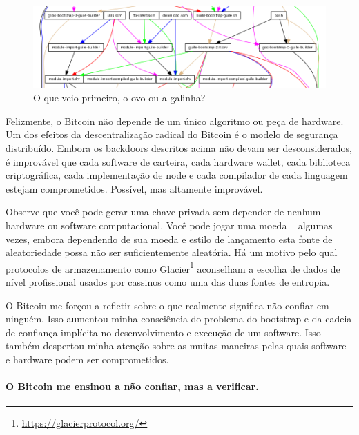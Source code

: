\begin{figure}
  \includegraphics{assets/images/guix-bootstrap-dependencies.png}
  \caption{O que veio primeiro, o ovo ou a galinha?}
  \label{fig:guix-bootstrap-dependencies}
\end{figure}

Felizmente, o Bitcoin não depende de um único algoritmo ou peça de hardware. Um dos efeitos da descentralização radical do Bitcoin é o modelo de segurança distribuído. Embora os backdoors descritos acima não devam ser desconsiderados, é improvável que cada software de carteira, cada hardware wallet, cada biblioteca criptográfica, cada implementação de node e cada compilador de cada linguagem estejam comprometidos. Possível, mas altamente improvável.

Observe que você pode gerar uma chave privada sem depender de nenhum hardware ou software computacional. Você pode jogar uma moeda ~\cite{antonopoulos2014mastering} algumas vezes, embora dependendo de sua moeda e estilo de lançamento esta fonte de aleatoriedade possa não ser suficientemente aleatória. Há um motivo pelo qual protocolos de armazenamento como Glacier\footnote{\url{https://glacierprotocol.org/}} aconselham a escolha de dados de nível profissional usados por cassinos como uma das duas fontes de entropia.

O Bitcoin me forçou a refletir sobre o que realmente significa não confiar em ninguém. Isso aumentou minha consciência do problema do bootstrap e da cadeia de confiança implícita no desenvolvimento e execução de um software. Isso também despertou minha atenção sobre as muitas maneiras pelas quais software e hardware podem ser comprometidos.

\paragraph{O Bitcoin me ensinou a não confiar, mas a verificar. }

